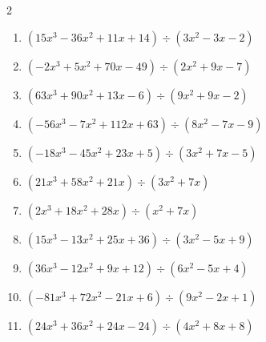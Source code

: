 \begin{multicols}{2}
\begin{enumerate}
        \phantom{$商 : -3x-4, \quad 剰余 : 4x+6$}

  \item $(15x^{3}-36x^{2}+11x+14) \div (3x^{2}-3x-2)$

        \phantom{$商 : 5x-7, \quad 剰余 : -3x-9$}

\columnbreak %

  \item $(-2x^{3}+5x^{2}+70x-49) \div (2x^{2}+9x-7)$

        \phantom{$商 : -x+7, \quad 剰余 : 9x-4$}

  \item $(63x^{3}+90x^{2}+13x-6) \div (9x^{2}+9x-2)$

        \phantom{$商 : 7x+3, \quad 剰余 : -1$}

  \item $(-56x^{3}-7x^{2}+112x+63) \div (8x^{2}-7x-9)$

        \phantom{$商 : -7x-7, \quad 剰余 : 4x-6$}

  \item $(-18x^{3}-45x^{2}+23x+5) \div (3x^{2}+7x-5)$

        \phantom{$商 : -6x-1, \quad 剰余 : 3x$}

  \item $(21x^{3}+58x^{2}+21x) \div (3x^{2}+7x)$

        \phantom{$商 : 7x+3, \quad 剰余 : -2x-9$}

\columnbreak %

\resetques

  \item $(2x^{3}+18x^{2}+28x) \div (x^{2}+7x)$

        \phantom{$商 : 2x+4, \quad 剰余 : -6x+1$}

  \item $(15x^{3}-13x^{2}+25x+36) \div (3x^{2}-5x+9)$

        \phantom{$商 : 5x+4, \quad 剰余 : x-7$}

  \item $(36x^{3}-12x^{2}+9x+12) \div (6x^{2}-5x+4)$

        \phantom{$商 : 6x+3, \quad 剰余 : -5x-3$}

  \item $(-81x^{3}+72x^{2}-21x+6) \div (9x^{2}-2x+1)$

        \phantom{$商 : -9x+6, \quad 剰余 : -6x-8$}

  \item $(24x^{3}+36x^{2}+24x-24) \div (4x^{2}+8x+8)$


\end{enumerate}
\end{multicols}
